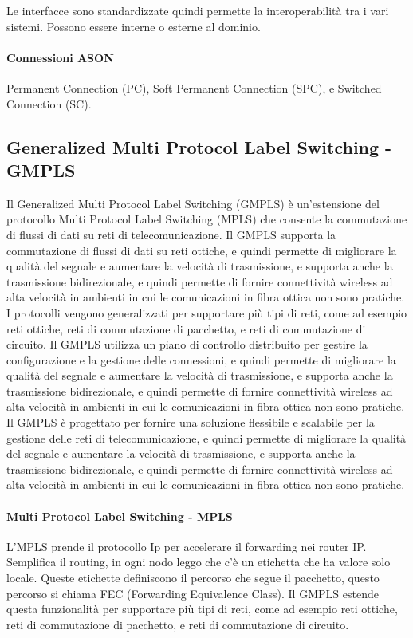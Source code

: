 Le interfacce sono standardizzate quindi permette la interoperabilità tra i vari sistemi. Possono essere interne o esterne al dominio.\\    

\paragraph{Connessioni ASON}
Permanent Connection (PC), Soft Permanent Connection (SPC), e Switched Connection (SC).\\

\subsection{Generalized Multi Protocol Label Switching - GMPLS}
Il Generalized Multi Protocol Label Switching (GMPLS) è un'estensione del protocollo Multi Protocol Label Switching (MPLS) che consente la commutazione di flussi di dati su reti di telecomunicazione. Il GMPLS supporta la commutazione di flussi di dati su reti ottiche, e quindi permette di migliorare la qualità del segnale e aumentare la velocità di trasmissione, e supporta anche la trasmissione bidirezionale, e quindi permette di fornire connettività wireless ad alta velocità in ambienti in cui le comunicazioni in fibra ottica non sono pratiche.\\

I protocolli vengono generalizzati per supportare più tipi di reti, come ad esempio reti ottiche, reti di commutazione di pacchetto, e reti di commutazione di circuito. Il GMPLS utilizza un piano di controllo distribuito per gestire la configurazione e la gestione delle connessioni, e quindi permette di migliorare la qualità del segnale e aumentare la velocità di trasmissione, e supporta anche la trasmissione bidirezionale, e quindi permette di fornire connettività wireless ad alta velocità in ambienti in cui le comunicazioni in fibra ottica non sono pratiche.\\

Il GMPLS è progettato per fornire una soluzione flessibile e scalabile per la gestione delle reti di telecomunicazione, e quindi permette di migliorare la qualità del segnale e aumentare la velocità di trasmissione, e supporta anche la trasmissione bidirezionale, e quindi permette di fornire connettività wireless ad alta velocità in ambienti in cui le comunicazioni in fibra ottica non sono pratiche.\\

\paragraph{Multi Protocol Label Switching - MPLS}
L'MPLS prende il protocollo Ip per accelerare il forwarding nei router IP. Semplifica il routing, in ogni nodo leggo che c'è un etichetta che ha valore solo locale. Queste etichette definiscono il percorso che segue il pacchetto, questo percorso si chiama FEC (Forwarding Equivalence Class). Il GMPLS estende questa funzionalità per supportare più tipi di reti, come ad esempio reti ottiche, reti di commutazione di pacchetto, e reti di commutazione di circuito.\\

